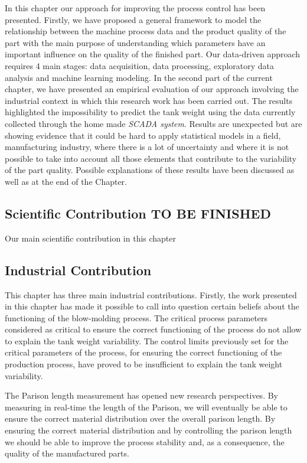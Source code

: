 In this chapter our approach for improving the process control has been presented. Firstly, we have proposed a general framework to model the relationship between the machine process data and the product quality of the part with the main purpose of understanding which parameters have an important influence on the quality of the finished part. Our data-driven approach requires 4 main stages: data acquisition, data processing, exploratory data analysis and machine learning modeling.  
In the second part of the current chapter, we have presented an empirical evaluation of our approach involving the industrial context in which this research work has been carried out. The results highlighted the impossibility to predict the tank weight using the data currently collected through the home made \textit{SCADA system}. Results are unexpected but are showing evidence that it could be hard to apply statistical models in a field, manufacturing industry, where there is a lot of uncertainty and where it is not possible to take into account all those elements that contribute to the variability of the part quality. Possible explanations of these results have been discussed as well as at the end of the Chapter.

\subsection{Scientific Contribution TO BE FINISHED}

Our main scientific contribution in this chapter



\subsection{Industrial Contribution}

This chapter has three main industrial contributions. Firstly, the work presented in this chapter has made it possible to call into question certain beliefs about the functioning of the blow-molding process. The critical process parameters considered as critical to ensure the correct functioning of the process do not allow to explain the tank weight variability. The control limits previously set for the critical parameters of the process, for ensuring the correct functioning of the production process, have proved to be insufficient to explain the tank weight variability. 

The Parison length measurement has opened new research perspectives. By measuring in real-time the length of the Parison, we will eventually be able to ensure the correct material distribution over the overall parison length. By ensuring the correct material distribution and by controlling the parison length we should be able to improve the process stability and, as a consequence, the quality of the manufactured parts. 

